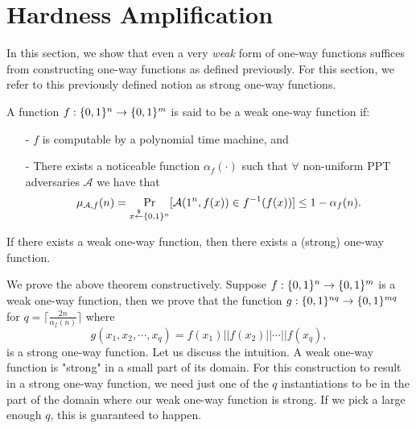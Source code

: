 
\section{Hardness Amplification}
\label{sec:owf:amplify}
In this section, we show that even a very \emph{weak} form of one-way functions suffices from constructing one-way functions as defined previously. For this section, we refer to this previously defined notion as strong one-way functions.
\begin{definition}
A function $f : \{0,1\}^{n} \rightarrow \{0,1\}^{m}$ is said to be a weak one-way function if:
\begin{itemize}
\item[-] $f$ is computable by a polynomial time machine, and
\item[-] There exists a noticeable function $\alpha_f(\cdot)$ such that $\forall$ non-uniform PPT adversaries $\mathcal{A}$ we have that
    $$
    \mu_{\mathcal{A},f}(n) =
    \Pr_{x \stackrel{\$}{\leftarrow} \{0,1\}^{n}}[ \mathcal{A}(1^n, f(x)) \in f^{-1}(f(x))] \leq 1 - \alpha_{f}(n).
    $$
\end{itemize}
\end{definition}

\begin{theorem}\label{theorem:weakstrongOWF}
If there exists a weak one-way function, then there exists a (strong) one-way function.
\end{theorem}

\proof We prove the above theorem constructively. Suppose $f : \{0,1\}^{n} \rightarrow \{0,1\}^{m}$ is a weak one-way function, then we prove that the function $g: \{0,1\}^{nq} \rightarrow \{0,1\}^{mq}$ for $q = \lceil \frac{2n}{\alpha_{f}(n)} \rceil$ where 
$$g(x_1, x_2, \cdots, x_q) = f(x_1) || f(x_2) || \cdots || f(x_q),$$
 is a strong one-way function. Let us discuss the intuition. A weak one-way function is "strong" in a small part of its domain. For this construction to result in a strong one-way function, we need just one of the $q$ instantiations to be in the part of the domain where our weak one-way function is strong. If we pick a large enough $q$, this is guaranteed to happen.

